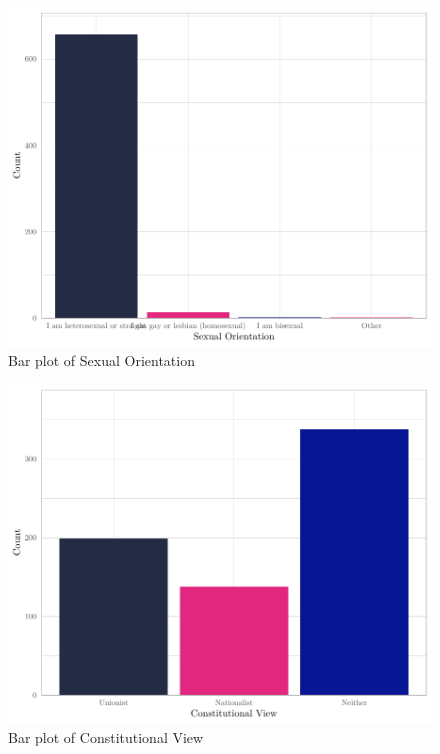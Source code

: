 \documentclass[
]{article}
\begin{document}
\begin{figure}[H]

{\centering \includegraphics[width=0.8\linewidth]{paper_files/figure-latex/unnamed-chunk-7-1} 

}

\caption{Bar plot of Sexual Orientation}\label{fig:unnamed-chunk-7}
\end{figure}

\begin{figure}[H]

{\centering \includegraphics[width=0.8\linewidth]{paper_files/figure-latex/unnamed-chunk-8-1} 

}

\caption{Bar plot of Constitutional View}\label{fig:unnamed-chunk-8}
\end{figure}
\end{document}
